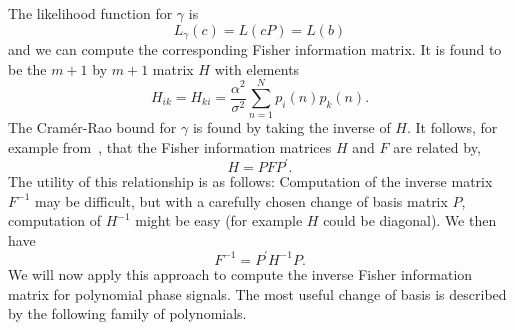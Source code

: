 \documentclass[journal,10pt]{IEEEtran}
\begin{document}
The likelihood function for $\gamma$ is 
\[
L_\gamma(c) = L(cP) = L(b)
\] 
and we can compute the corresponding Fisher information matrix.  It is found to be the $m+1$ by $m+1$ matrix $H$ with elements
\[
H_{ik} = H_{ki} = \frac{\alpha^2}{\sigma^2}\sum_{n=1}^{N} p_{i}(n) p_{k}(n).
\]
The Cram\'{e}r-Rao bound for $\gamma$ is found by taking the inverse of $H$.  It follows, for example from~\cite[Sec. 3.8]{Kay1993_stat_sig_est_theory}, that the Fisher information matrices $H$ and $F$ are related by,
\[
H = P F P^\prime.
\]
The utility of this relationship is as follows:  Computation of the inverse matrix $F^{-1}$ may be difficult, but with a carefully chosen change of basis matrix $P$, computation of $H^{-1}$ might be easy (for example $H$ could be diagonal).  We then have
\[
F^{-1} = P^\prime H^{-1} P.
\]  
We will now apply this approach to compute the inverse Fisher information matrix for polynomial phase signals.  The most useful change of basis is described by the following family of polynomials.


\end{document}
